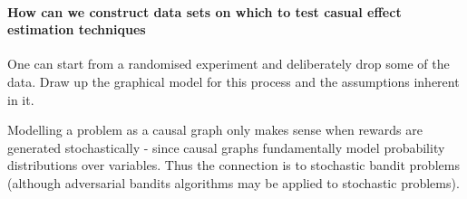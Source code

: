 \paragraph*{How can we construct data sets on which to test casual effect estimation techniques}
One can start from a randomised experiment and deliberately drop some of the data. Draw up the graphical model for this process and the assumptions inherent in it. 

Modelling a problem as a causal graph only makes sense when rewards are generated stochastically - since causal graphs fundamentally model probability distributions over variables. Thus the connection is to stochastic bandit problems (although adversarial bandits algorithms may be applied to stochastic problems).

